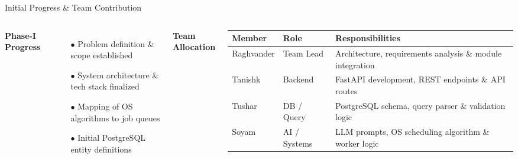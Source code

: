 \documentclass[aspectratio=169,11pt]{beamer}
\begin{document}

\begin{frame}{Initial Progress \& Team Contribution}

\begin{columns}[T,totalwidth=\textwidth]

\textbf{\color{GEUBlue}\small Phase-I Progress}
\begin{itemize}\itemsep1.5pt
\item[\tiny$\bullet$] \scriptsize Problem definition \& scope established
\item[\tiny$\bullet$] \scriptsize System architecture \& tech stack finalized
\item[\tiny$\bullet$] \scriptsize Mapping of OS algorithms to job queues
\item[\tiny$\bullet$] \scriptsize Initial PostgreSQL entity definitions
\end{itemize}

\textbf{\color{GEUBlue}\small Team Allocation}

\vspace{1mm}
\fontsize{6}{7.5}\selectfont
\begin{tabularx}{\textwidth}{@{}p{1.4cm}p{1.3cm}X@{}}
\toprule
\textbf{Member} & \textbf{Role} & \textbf{Responsibilities} \\
\midrule
Raghvander & Team Lead & Architecture, requirements analysis \& module integration \\
Tanishk & Backend & FastAPI development, REST endpoints \& API routes \\
Tushar & DB / Query & PostgreSQL schema, query parser \& validation logic \\
Soyam & AI / Systems & LLM prompts, OS scheduling algorithm \& worker logic \\
\bottomrule
\end{tabularx}

\end{columns}

\end{frame}


\end{document}
